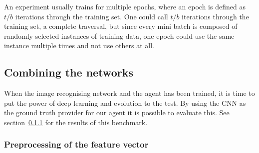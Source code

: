 An experiment usually trains for multiple epochs, where an epoch is defined as $t/b$ iterations through the training set. One could call $t/b$ iterations through the training set, a complete traversal, but since every mini batch is composed of randomly selected instances of training data, one epoch could use the same instance multiple times and not use others at all.

\subsection{Combining the networks}
When the image recognising network and the agent has been trained, it is time to put the power of deep learning and evolution to the test. By using the CNN as the ground truth provider for our agent it is possible to evaluate this. See section~\ref{} for the results of this benchmark.
\subsubsection{Preprocessing of the feature vector}
















































